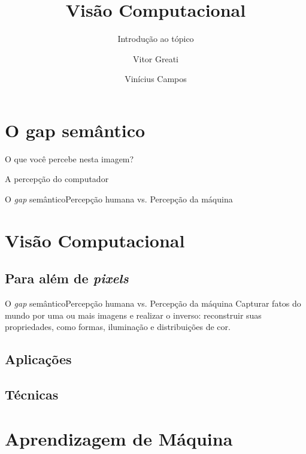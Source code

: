 \documentclass{beamer}
\title{Visão Computacional}
\subtitle{Introdução ao tópico}
\author{Vitor Greati\inst{1} \and Vinícius Campos\inst{1}}
\institute[]
{
	\inst{1}%
	Universidade Federal do Rio Grande do Norte
}
\date{}
\begin{document}
\frame{\titlepage}

\section{O gap semântico}

    \begin{frame}{O que você percebe nesta imagem?}

    \end{frame}

    \begin{frame}{A percepção do computador}

    \end{frame}
    
    \begin{frame}{O \emph{gap} semântico}{Percepção humana vs. Percepção da máquina}
    
    \end{frame}

\section{Visão Computacional}

    \subsection{Para além de \emph{pixels}}

    \begin{frame}{O \emph{gap} semântico}{Percepção humana vs. Percepção da máquina}
        Capturar fatos do mundo por uma ou mais imagens e realizar o inverso: reconstruir suas propriedades, 
        como formas, iluminação e distribuições de cor.
    \end{frame}

    \subsection{Aplicações}

    \subsection{Técnicas}

\section{Aprendizagem de Máquina}
\end{document}
